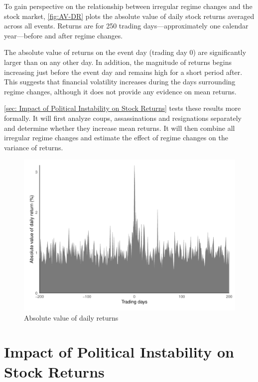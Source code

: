 \documentclass[12pt,final,fleqn]{article}
\theoremstyle{plain}
\begin{document}
To gain perspective on the relationship between irregular regime changes and the stock market, \autoref{fig:AV-DR} plots the absolute value of daily stock returns averaged across all events. Returns are for 250 trading days---approximately one calendar year---before and after regime changes.

The absolute value of returns on the event day (trading day 0) are significantly larger than on any other day. In addition, the magnitude of returns begins increasing just before the event day and remains high for a short period after. This suggests that financial volatility increases during the days surrounding regime changes, although it does not provide any evidence on mean returns.

\autoref{sec: Impact of Political Instability on Stock Returns} tests these results more formally. It will first analyze coups, assassinations and resignations separately and determine whether they increase mean returns. It will then combine all irregular regime changes and estimate the effect of regime changes on the variance of returns.

\begin{figure}[!ht]
\includegraphics{../figs/daily_mean_absreturn.pdf}
\caption{Absolute value of daily returns}
\label{fig:AV-DR}
\end{figure}


\section{Impact of Political Instability on Stock Returns} \label{sec: Impact of Political Instability on Stock Returns}
\end{document}
